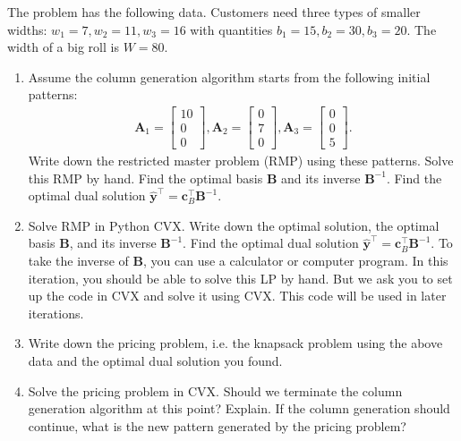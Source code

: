\documentclass[11pt]{article}
\newcommand{\mb}[1]{\ensuremath{\boldsymbol{#1}}}
\begin{document}
The problem has the following data. Customers need three types of smaller widths: $w_1 = 7, w_2 = 11, w_3 = 16$ with quantities $b_1 = 15, b_2 = 30, b_3 = 20$. The width of a big roll is $W = 80$. 
\begin{enumerate}
\item Assume the column generation algorithm starts from the following initial patterns:
\begin{align*}
\mb{A}_1 = \begin{bmatrix} 10 \\ 0 \\ 0\end{bmatrix}, \mb{A}_2 = \begin{bmatrix} 0 \\ 7 \\ 0\end{bmatrix}, \mb{A}_3 = \begin{bmatrix} 0 \\ 0 \\5\end{bmatrix}.
\end{align*}
Write down the restricted master problem (RMP) using these patterns. Solve this RMP by hand. Find the optimal basis $\mb{B}$ and its inverse $\mb{B}^{-1}$. Find the optimal dual solution $\hat{\mb{y}}^\top=\mb{c}_B^\top\mb{B}^{-1}$.


\color{black}
\item Solve RMP in Python CVX. Write down the optimal solution, the optimal basis
$\mb{B}$, and its inverse $\mb{B}^{-1}$. Find the optimal dual solution $\hat{\mb{y}}^\top=\mb{c}_B^\top\mb{B}^{-1}$. To take the inverse
of $\mb{B}$, you can use a calculator or computer program. In this iteration, you should be able to solve this LP by hand. But we ask you to set up the code in CVX and solve it using CVX. This code will be used in later iterations.



\color{black}
\item Write down the pricing problem, i.e. the knapsack problem using the above data and the optimal dual solution you found. 


\color{black}
\item Solve the pricing problem in CVX. Should we terminate the column generation algorithm at this point? Explain. If the column generation should continue, what is the new pattern generated by the pricing problem? 




\end{enumerate}
\end{document}
